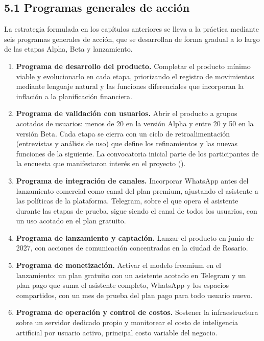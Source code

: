 
\subsection*{5.1 Programas generales de
acción}\label{programas-generales-de-acciuxf3n}

La estrategia formulada en los capítulos anteriores se lleva a la
práctica mediante seis programas generales de acción, que se desarrollan
de forma gradual a lo largo de las etapas Alpha, Beta y lanzamiento.

\begin{enumerate}
\def\labelenumi{\arabic{enumi}.}
\tightlist
\item
  \textbf{Programa de desarrollo del producto.} Completar el producto
  mínimo viable y evolucionarlo en cada etapa, priorizando el registro
  de movimientos mediante lenguaje natural y las funciones diferenciales
  que incorporan la inflación a la planificación financiera.
\item
  \textbf{Programa de validación con usuarios.} Abrir el producto a
  grupos acotados de usuarios: menos de 20 en la versión Alpha y entre
  20 y 50 en la versión Beta. Cada etapa se cierra con un ciclo de
  retroalimentación (entrevistas y análisis de uso) que define los
  refinamientos y las nuevas funciones de la siguiente. La convocatoria
  inicial parte de los participantes de la encuesta que manifestaron
  interés en el proyecto ().
\item
  \textbf{Programa de integración de canales.} Incorporar WhatsApp antes
  del lanzamiento comercial como canal del plan premium, ajustando el
  asistente a las políticas de la plataforma. Telegram, sobre el que
  opera el asistente durante las etapas de prueba, sigue siendo el canal
  de todos los usuarios, con un uso acotado en el plan gratuito.
\item
  \textbf{Programa de lanzamiento y captación.} Lanzar el producto en
  junio de 2027, con acciones de comunicación concentradas en la ciudad
  de Rosario.
\item
  \textbf{Programa de monetización.} Activar el modelo freemium en el
  lanzamiento: un plan gratuito con un asistente acotado en Telegram y
  un plan pago que suma el asistente completo, WhatsApp y los espacios
  compartidos, con un mes de prueba del plan pago para todo usuario
  nuevo.
\item
  \textbf{Programa de operación y control de costos.} Sostener la
  infraestructura sobre un servidor dedicado propio y monitorear el
  costo de inteligencia artificial por usuario activo, principal costo
  variable del negocio.
\end{enumerate}

